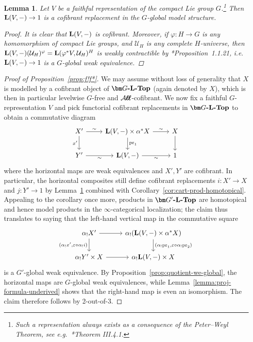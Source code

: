 \documentclass[reqno]{memo-l}
\theoremstyle{mythm}
\newtheorem{lemma}[thm]{Lemma}
\theoremstyle{definition}
\numberwithin{equation}{section}
\newcommand{\Aa}{{\mathcal{A}}}
\newcommand{\Uu}{{\mathcal{U}}}
\renewcommand{\phi}{\varphi}
\renewcommand{\epsilon}{\varepsilon}
\newcommand{\cat}[1]{\textbf{\textup{#1}}}
\newcommand{\pr}{\textup{pr}}
\newcommand{\bigAll}{\hbox{\hfuzz=20pt\hbox{$\mathcal A\kern-.3pt$}\setbox0=\hbox{$\ell\kern-.75pt\ell$}\hbox to 0pt{\hfuzz=8pt\kern-.075pt\unhcopy0}\hbox to 0pt{\hfuzz=8pt\kern.075pt\unhcopy0}\box0\kern.05pt}}
\newcommand{\smallAll}{\Aa\kern-.3pt\ell\kern-.6pt\ell}
\newcommand{\All}{\mathchoice{\bigAll}{\bigAll}{\smallAll}{\smallAll}}
\begin{document}
\begin{lemma}\label{lemma:resolve-pt}
    Let $V$ be a faithful representation of the compact Lie group $G$.\footnote{Such a representation always exists as a consequence of the Peter--Weyl Theorem, see e.g.\ \cite{broecker-tom-dieck}*{Theorem III.4.1}.} Then $\cat{L}(V,-)\to1$ is a cofibrant replacement in the $G$-global model structure.
    \begin{proof}
        It is clear that $\cat{L}(V,-)$ is cofibrant. Moreover, if $\phi\colon H\to G$ is any homomorphism of compact Lie groups, and $\Uu_H$ is any complete $H$-universe, then $\cat{L}(V,-)(\Uu_H)^\phi=\cat{L}(\phi^*V,\Uu_H)^H$ is weakly contractible by \cite{schwede2018global}*{Proposition~1.1.21}, i.e. $\cat{L}(V,-)\to1$ is a $G$-global weak equivalence.
    \end{proof}
\end{lemma}

\begin{proof}[Proof of Proposition~\ref{prop:f!f*}]
    We may assume without loss of generality that $X$ is modelled by a cofibrant object of $\cat{$\bm G$-$\cat{L}$-Top}$ (again denoted by $X$), which is then in particular levelwise $G$-free and $\All$-cofibrant. We now fix a faithful $G$-representation $V$ and pick functorial cofibrant replacements in $\cat{$\bm G$-${\cat L}$-Top}$ to obtain a commutative diagram
    \[
        \begin{tikzcd}
            X'\arrow[d,"x'"']\arrow[r,"\sim"] & \cat{L}(V,-)\times\alpha^
            *X\arrow[d,"\pr_1"]\arrow[r,"\sim"]&X\arrow[d]\\
            Y'\arrow[r,"\sim"']&\cat{L}(V,-)\arrow[r,"\sim"']&1
        \end{tikzcd}
    \]
    where the horizontal maps are weak equivalences and $X',Y'$ are cofibrant. In particular, the horizontal composites still define cofibrant replacements $i\colon X'\to X$ and $j\colon Y'\to 1$ by Lemma~\ref{lemma:resolve-pt} combined with Corollary~\ref{cor:cart-prod-homotopical}. Appealing to the corollary once more, products in $\cat{$\bm G'$-$\cat{L}$-Top}$ are homotopical and hence model products in the $\infty$-categorical localization; the claim thus translates to saying that the left-hand vertical map in the commutative square
    \[
        \begin{tikzcd}
            \alpha_!X'\arrow[d, "{(\alpha_!x', \epsilon\circ \alpha_!i)}"']\arrow[r] & \alpha_!(\cat{L}(V,-)\times \alpha^*X)\arrow[d,"{(\alpha_!\pr_1,\epsilon\circ \alpha_!\pr_2)}\,"]\\
            \alpha_!Y'\times X\arrow[r] & \alpha_!\cat{L}(V,-)\times X
        \end{tikzcd}
    \]
    is a $G'$-global weak equivalence. By Proposition~\ref{prop:quotient-we-global}, the horizontal maps are $G$-global weak equivalences, while Lemma~\ref{lemma:proj-formula-underived} shows that the right-hand map is even an isomorphism. The claim therefore follows by 2-out-of-3.
\end{proof}
\end{document}

